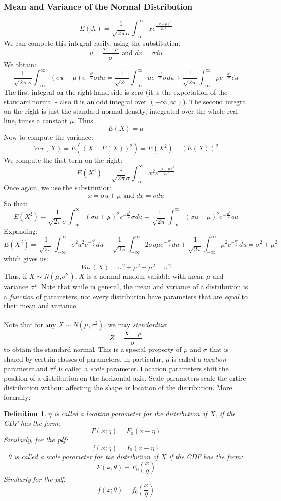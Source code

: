 \documentclass[12pt]{article} %
\newtheorem{defn}{Definition}
\begin{document}
\subsubsection{Mean and Variance of the Normal Distribution}
$$E(X) = \frac1{\sqrt{2\pi}\sigma} \int_{-\infty}^{\infty}x e^{\frac{\left(x-\mu\right)^2}{2\sigma^2}}$$
We can compute this integral easily, using the substitution:
$$u=\frac{x-\mu}{\sigma} \textrm{ and } dx=\sigma du$$
We obtain:
$$\frac1{\sqrt{2\pi}\sigma} \int_{-\infty}^{\infty}(\sigma u + \mu)e^{-\frac{u^2}2} \sigma du = \frac1{\sqrt{2\pi}} \int_{-\infty}^{\infty}u e^{-\frac{u^2}2} \sigma du + \frac1{\sqrt{2\pi}} \int_{-\infty}^{\infty}\mu e^{-\frac{u^2}2}du$$
The first integral on the right hand side is zero (it is the expectation of the standard normal - also it is an odd integral over $(-\infty,\infty)$). The second integral on the right is just the standard normal density, integrated over the whole real line, times a constant $\mu$. Thus:
$$E(X) = \mu$$
Now to compute the variance:
$$Var(X) = E\left((X-E(X))^2\right) = E(X^2) - \left(E(X)\right)^2$$
We compute the first term on the right:
$$E(X^2) = \frac1{\sqrt{2\pi}\sigma} \int_{-\infty}^{\infty}x^2 e^{\frac{\left(x-\mu\right)^2}{2\sigma^2}}$$
Once again, we use the substitution:
$$x= \sigma u + \mu \textrm { and } dx = \sigma du$$
So that:
$$E(X^2) = \frac1{\sqrt{2\pi}\sigma} \int_{-\infty}^{\infty}(\sigma u + \mu)^2 e^{-\frac{u^2}{2}}\sigma du =  \frac1{\sqrt{2\pi}} \int_{-\infty}^{\infty}(\sigma u + \mu)^2 e^{-\frac{u^2}{2}} du$$
Expanding:
$$E(X^2) =  \frac1{\sqrt{2\pi}} \int_{-\infty}^{\infty}\sigma^2 u^2 e^{-\frac{u^2}{2}} du +  \frac1{\sqrt{2\pi}} \int_{-\infty}^{\infty}2\sigma u \mu e^{-\frac{u^2}{2}} du+  \frac1{\sqrt{2\pi}} \int_{-\infty}^{\infty}\mu^2 e^{-\frac{u^2}{2}} du = \sigma^2+\mu^2$$
which gives us:
$$Var(X) =\sigma^2+\mu^2 - \mu^2 = \sigma^2$$ 
Thus, if $X\sim N(\mu,\sigma^2)$, $X$ is a normal random variable with mean $\mu$ and variance $\sigma^2$. Note that while in general, the mean and variance of a distribution is a \emph{function} of parameters, not every distribution have parameters that are \emph{equal} to their mean and variance.\\\\
Note that for any $X\sim N(\mu,\sigma^2)$, we may \emph{standardize}:
$$Z = \frac{X-\mu}{\sigma}$$
to obtain the standard normal. This is a special property of $\mu$ and $\sigma$ that is shared by certain classes of parameters. In particular, $\mu$ is called a \emph{location} parameter and $\sigma^2$ is called a \emph{scale} parameter. Location parameters shift the position of a distribution on the horizontal axis. Scale parameters scale the entire distribution without affecting the shape or location of the distribution. More formally:
\begin{defn}
$\eta$ is called a location parameter for the distribution of $X$, if the CDF has the form:
$$F(x;\eta) = F_0(x-\eta)$$
Similarly, for the pdf:
$$f(x;\eta) = f_0(x-\eta)$$.
$\theta$ is called a scale parameter for the distribution of $X$ if the CDF has the form:
$$F(x,\theta) = F_0\left(\frac{x}{\theta}\right)$$
Similarly for the pdf:
$$f(x;\theta) = f_0\left(\frac{x}{\theta}\right)$$
\end{defn}
\end{document}
